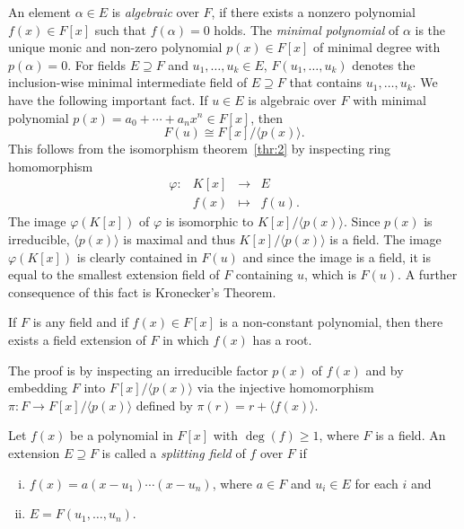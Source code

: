An element $α∈ E$ is \emph{algebraic} over $F$, if there exists a nonzero polynomial $f(x) ∈ F[x]$  such that $f(α)= 0 $ holds. The \emph{minimal polynomial} of $α$ is the unique monic and non-zero polynomial $p(x) ∈ F[x] $ of minimal degree with $p(α)=0$. For fields $E ⊇ F$ and $u_1,\dots,u_k ∈E$, $F(u_1,\dots,u_k)$ denotes the inclusion-wise minimal intermediate field of $E⊇F$ that contains $u_1,\dots,u_k$. We have the following important fact. If $u ∈E$ is algebraic over $F$ with minimal polynomial $p(x) = a_0+ \cdots + a_n x^n ∈F[x]$, then
\begin{equation}
  \label{eq:8}
  F(u) ≅ F[x] / 〈p(x)〉.  
\end{equation}
This follows from the isomorphism theorem~\ref{thr:2} by inspecting  ring homomorphism
\begin{equation}
  \label{eq:10}
  \begin{array}{rccc}
    φ: & K[x] &→&  E \\
       &  f(x) & ↦ & f(u). 
  \end{array}
\end{equation}
The image $φ(K[x])$ of $φ$ is isomorphic to $ K[x] / 〈p(x)〉$. Since $p(x)$ is irreducible, $〈p(x)〉$ is maximal and thus $ K[x] / 〈p(x)〉$ is a field. The image $φ(K[x])$ is clearly contained in  $F(u)$ and since the image is a field, it is equal to the smallest extension field of $F$ containing $u$, which is $F(u)$. A further consequence of this fact is Kronecker's Theorem.
\begin{theorem}
  \label{thr:11}
  If $F$ is any field and if $f(x) ∈ F[x]$ is a non-constant polynomial, then there exists a field extension of $F$ in which $f(x)$ has a root. 
\end{theorem}
The proof is by inspecting an irreducible factor $p(x)$ of $f(x)$ and by embedding $F$ into $F[x] / 〈p(x)〉$ via the injective homomorphism $π: F →F[x] / 〈p(x)〉$  defined by  $π(r) = r + 〈f(x)〉$.


\begin{definition}
  \label{def:1}
  Let $f(x)$ be a polynomial in $F[x]$ with $\deg(f) ≥1$, where $F$ is a field. An extension $E ⊇F$ is called a \emph{splitting field} of $f$ over $F$ if
  \begin{enumerate}[i)]
  \item  $f(x) = a (x-u_1) \cdots (x - u_n)$, where $a ∈F$ and $u_i ∈E$ for each $i$ and
  \item $E = F(u_1,\dots,u_n)$. 
  \end{enumerate}
\end{definition}


